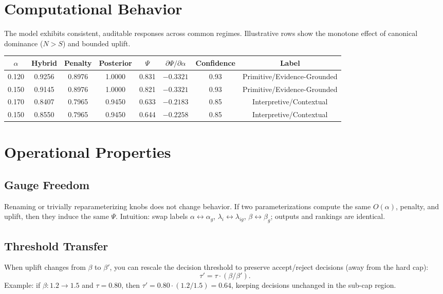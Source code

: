 \documentclass[12pt,a4paper]{article}
\begin{document}
\section{Computational Behavior}
The model exhibits consistent, auditable responses across common regimes. Illustrative rows show the monotone effect of canonical dominance ($N>S$) and bounded uplift.
\begin{center}
\begin{tabular}{@{}cccccccc@{}}
\toprule
$\alpha$ & Hybrid & Penalty & Posterior & $\Psi$ & $\partial\Psi/\partial\alpha$ & Confidence & Label \\
\midrule
0.120 & 0.9256 & 0.8976 & 1.0000 & 0.831 & $-0.3321$ & 0.93 & Primitive/Evidence-Grounded \\
0.150 & 0.9145 & 0.8976 & 1.0000 & 0.821 & $-0.3321$ & 0.93 & Primitive/Evidence-Grounded \\
\midrule
0.170 & 0.8407 & 0.7965 & 0.9450 & 0.633 & $-0.2183$ & 0.85 & Interpretive/Contextual \\
0.150 & 0.8550 & 0.7965 & 0.9450 & 0.644 & $-0.2258$ & 0.85 & Interpretive/Contextual \\
\bottomrule
\end{tabular}
\end{center}

\section{Operational Properties}
\subsection{Gauge Freedom}
Renaming or trivially reparameterizing knobs does not change behavior. If two parameterizations compute the same $O(\alpha)$, penalty, and uplift, then they induce the same $\Psi$. Intuition: swap labels $\alpha\leftrightarrow \alpha_g$, $\lambda_i\leftrightarrow \lambda_{ig}$, $\beta\leftrightarrow\beta_g$; outputs and rankings are identical.

\subsection{Threshold Transfer}
When uplift changes from $\beta$ to $\beta'$, you can rescale the decision threshold to preserve accept/reject decisions (away from the hard cap):
\begin{equation}
\tau' = \tau\cdot (\beta/\beta').
\end{equation}
Example: if $\beta:1.2\to 1.5$ and $\tau=0.80$, then $\tau'=0.80\cdot(1.2/1.5)=0.64$, keeping decisions unchanged in the sub-cap region.
\end{document}
